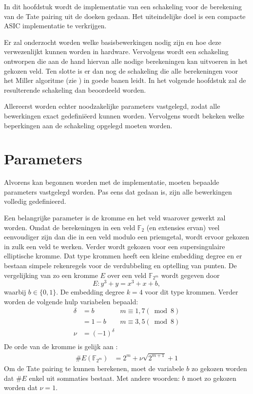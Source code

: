 
In dit hoofdstuk wordt de implementatie van een schakeling voor de berekening van de Tate pairing uit de doeken gedaan. Het uiteindelijke doel is een compacte ASIC implementatie te verkrijgen.

Er zal onderzocht worden welke basisbewerkingen nodig zijn en hoe deze verwezenlijkt kunnen worden in hardware. Vervolgens wordt een schakeling ontworpen die aan de hand hiervan alle nodige berekeningen kan uitvoeren in het gekozen veld. Ten slotte is er dan nog de schakeling die alle berekeningen voor het Miller algoritme (zie ) in goede banen leidt. In het volgende hoofdstuk zal de resulterende schakeling dan beoordeeld worden.

Allereerst worden echter noodzakelijke parameters vastgelegd, zodat alle bewerkingen exact gedefini\"eerd kunnen worden. Vervolgens wordt bekeken welke beperkingen aan de schakeling opgelegd moeten worden.

\section{Parameters\label{sectie-implementatie-parameters}}

Alvorens kan begonnen worden met de implementatie, moeten bepaalde parameters vastgelegd worden. Pas eens dat gedaan is, zijn alle bewerkingen volledig gedefinieerd.

Een belangrijke parameter is de kromme en het veld waarover gewerkt zal worden. Omdat de berekeningen in een veld $\mathbb{F}_2$ (en extensies ervan) veel eenvoudiger zijn dan die in een veld modulo een priemgetal, wordt ervoor gekozen in zulk een veld te werken.
Verder wordt gekozen voor een supersingulaire elliptische kromme. Dat type krommen heeft een kleine embedding degree en er bestaan simpele rekenregels voor de verdubbeling en optelling van punten. De vergelijking van zo een kromme $E$ over een veld $\mathbb{F}_{2^m}$ wordt gegeven door
\[E: y^3 + y = x^3 + x + b,\]
waarbij $b \in \{0, 1\}$. De embedding degree $k = 4$ voor dit type krommen. Verder worden de volgende hulp variabelen bepaald:
\[\begin{aligned}
\delta	&= b	\qquad	& m \equiv 1, 7 (\bmod 8)\\
			&= 1 - b		& m \equiv 3, 5 (\bmod 8)\\
\nu		&= (-1)^{\delta}\\
\end{aligned}\]
De orde van de kromme is gelijk aan \cite{bertoni, beuchat}:
\[\begin{aligned}
\#E(\mathbb{F}_{2^m})	&= 2^m + \nu \sqrt{2^{m + 1}} + 1
\end{aligned}\]
Om de Tate pairing te kunnen berekenen, moet de variabele $b$ zo gekozen worden dat $\#E$ enkel uit sommaties bestaat. Met andere woorden: $b$ moet zo gekozen worden dat $\nu = 1$.

